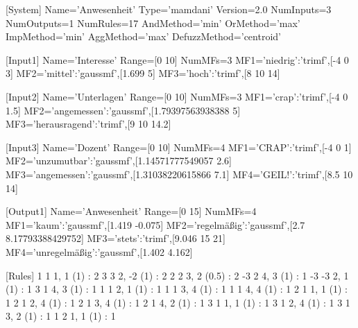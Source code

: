 [System]
Name='Anwesenheit'
Type='mamdani'
Version=2.0
NumInputs=3
NumOutputs=1
NumRules=17
AndMethod='min'
OrMethod='max'
ImpMethod='min'
AggMethod='max'
DefuzzMethod='centroid'

[Input1]
Name='Interesse'
Range=[0 10]
NumMFs=3
MF1='niedrig':'trimf',[-4 0 3]
MF2='mittel':'gaussmf',[1.699 5]
MF3='hoch':'trimf',[8 10 14]

[Input2]
Name='Unterlagen'
Range=[0 10]
NumMFs=3
MF1='crap':'trimf',[-4 0 1.5]
MF2='angemessen':'gaussmf',[1.79397563938388 5]
MF3='herausragend':'trimf',[9 10 14.2]

[Input3]
Name='Dozent'
Range=[0 10]
NumMFs=4
MF1='CRAP':'trimf',[-4 0 1]
MF2='unzumutbar':'gaussmf',[1.14571777549057 2.6]
MF3='angemessen':'gaussmf',[1.31038220615866 7.1]
MF4='GEIL!':'trimf',[8.5 10 14]

[Output1]
Name='Anwesenheit'
Range=[0 15]
NumMFs=4
MF1='kaum':'gaussmf',[1.419 -0.075]
MF2='regelmäßig':'gaussmf',[2.7 8.17793388429752]
MF3='stets':'trimf',[9.046 15 21]
MF4='unregelmäßig':'gaussmf',[1.402 4.162]

[Rules]
1 1 1, 1 (1) : 2
3 3 2, -2 (1) : 2
2 2 3, 2 (0.5) : 2
-3 2 4, 3 (1) : 1
-3 -3 2, 1 (1) : 1
3 1 4, 3 (1) : 1
1 1 2, 1 (1) : 1
1 1 3, 4 (1) : 1
1 1 4, 4 (1) : 1
2 1 1, 1 (1) : 1
2 1 2, 4 (1) : 1
2 1 3, 4 (1) : 1
2 1 4, 2 (1) : 1
3 1 1, 1 (1) : 1
3 1 2, 4 (1) : 1
3 1 3, 2 (1) : 1
1 2 1, 1 (1) : 1
